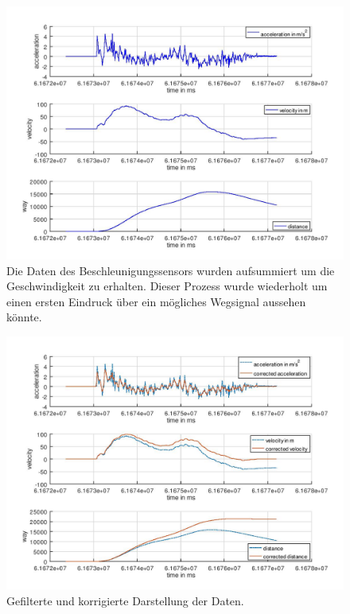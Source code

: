 \documentclass[12pt]{article}
\begin{document}
\begin{figure}[H]
	\centering
	\includegraphics[width=12cm]{images/testData.jpg}
	\caption{Die Daten des Beschleunigungssensors wurden aufsummiert um die Geschwindigkeit zu erhalten. Dieser Prozess wurde wiederholt um einen ersten Eindruck über ein mögliches Wegsignal aussehen könnte.}
	\label{fig:plainData}
\end{figure}

\begin{figure}[H]
	\centering
	\includegraphics[width=12cm]{images/filteredData.jpg}
	\caption{Gefilterte und korrigierte Darstellung der Daten.}
	\label{fig:filteredData}
\end{figure}



\end{document}
